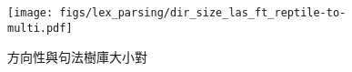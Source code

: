 \begin{figure}[h]
    \centering
    \texttt{[image: figs/lex\_parsing/dir\_size\_las\_ft\_reptile-to-multi.pdf]}
    \caption{方向性與句法樹庫大小對}
    \label{fig:dir-size-las-ft-reptile-to-multi}
\end{figure}